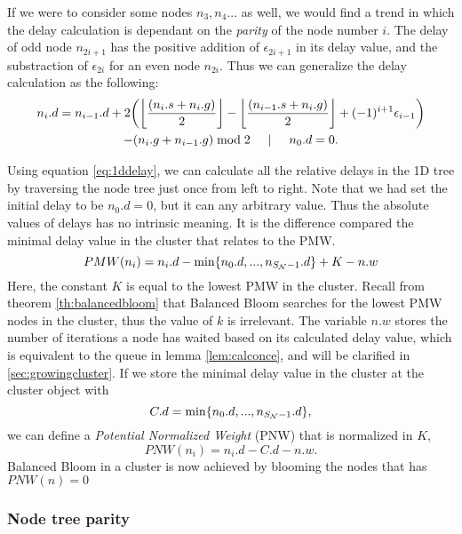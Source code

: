 If we were to consider some nodes $n_3, n_4...$ as well, we would find a trend in which the delay calculation is dependant on the \emph{parity} of the node number $i$. The delay of odd node $n_{2i+1}$ has the positive addition of $\epsilon_{2i+1}$ in its delay value, and the substraction of $\epsilon_{2i}$ for an even node $n_{2i}$. Thus we can generalize the delay calculation as the following:
\begin{multline}\label{eq:1ddelay}
n_i.d = n_{i-1}.d + 2\bigg({\left \lfloor \frac{(n_i.s+n_i.g)}{2} \right \rfloor } - {\left \lfloor \frac{(n_{i-1}.s+n_i.g)}{2} \right \rfloor } + (-1)^{i+1}\epsilon_{i-1}\bigg) \\
         - (n_{i}.g + n_{i-1}.g)\bmod 2 \hspace{.5cm} | \hspace{.5cm} n_0.d = 0.
\end{multline}

Using equation \ref{eq:1ddelay}, we can calculate all the relative delays in the 1D tree by traversing the node tree just once from left to right. Note that we had set the initial delay to be $n_0.d=0$, but it can any arbitrary value. Thus the absolute values of delays has no intrinsic meaning. It is the difference compared the minimal delay value in the cluster that relates to the PMW.
\begin{equation}\label{eq:pmw}
  PMW(n_i) = n_i.d - \min \{n_0.d,...,n_{S_{\mathcal{N}}-1}.d\} + K - n.w
\end{equation}
Here, the constant $K$ is equal to the lowest PMW in the cluster. Recall from theorem \ref{th:balancedbloom} that Balanced Bloom searches for the lowest PMW nodes in the cluster, thus the value of $k$ is irrelevant. The variable $n.w$ stores the number of iterations a node has waited based on its calculated delay value, which is equivalent to the queue in lemma \ref{lem:calconce}, and will be clarified in \ref{sec:growingcluster}. If we store the minimal delay value in the cluster at the cluster object with
\begin{equation}\label{eq:cd}
  C.d = \min \{n_0.d,...,n_{S_{\mathcal{N}}-1}.d\},
\end{equation}
we can define a \emph{Potential Normalized Weight} (PNW) that is normalized in $K$,
\begin{equation}\label{eq:pnw}
  PNW(n_i) = n_i.d - C.d - n.w.
\end{equation}
Balanced Bloom in a cluster is now achieved by blooming the nodes that has $PNW(n) = 0$


\subsubsection{Node tree parity}

